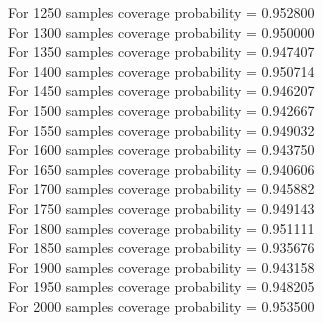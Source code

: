 \documentclass{article}
\begin{document}
For 1250 samples coverage probability = 0.952800\\
For 1300 samples coverage probability = 0.950000\\
For 1350 samples coverage probability = 0.947407\\
For 1400 samples coverage probability = 0.950714\\
For 1450 samples coverage probability = 0.946207\\
For 1500 samples coverage probability = 0.942667\\
For 1550 samples coverage probability = 0.949032\\
For 1600 samples coverage probability = 0.943750\\
For 1650 samples coverage probability = 0.940606\\
For 1700 samples coverage probability = 0.945882\\
For 1750 samples coverage probability = 0.949143\\
For 1800 samples coverage probability = 0.951111\\
For 1850 samples coverage probability = 0.935676\\
For 1900 samples coverage probability = 0.943158\\
For 1950 samples coverage probability = 0.948205\\
For 2000 samples coverage probability = 0.953500\\
\end{document}
